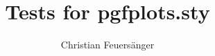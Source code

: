 \documentclass[a4paper,twocolumn]{report}
\author{Christian Feuers\"anger}
\title{Tests for pgfplots.sty}
\begin{document}
\maketitle
\tableofcontents

\raggedbottom




%











%

\end{document}
